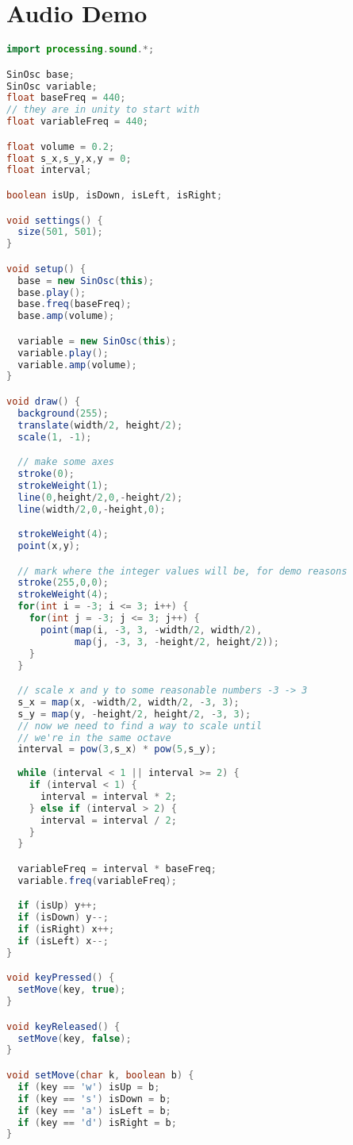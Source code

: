 \chapter{Audio Demo}
\label{audiodemo}
\begin{lstlisting}[language=java]
import processing.sound.*;

SinOsc base;
SinOsc variable;
float baseFreq = 440;
// they are in unity to start with
float variableFreq = 440;

float volume = 0.2;
float s_x,s_y,x,y = 0;
float interval;

boolean isUp, isDown, isLeft, isRight;

void settings() {
  size(501, 501);
}

void setup() {  
  base = new SinOsc(this);
  base.play();
  base.freq(baseFreq);
  base.amp(volume);

  variable = new SinOsc(this);
  variable.play();
  variable.amp(volume);
}

void draw() {
  background(255);
  translate(width/2, height/2);
  scale(1, -1);

  // make some axes
  stroke(0);
  strokeWeight(1);
  line(0,height/2,0,-height/2);
  line(width/2,0,-height,0);

  strokeWeight(4);
  point(x,y);

  // mark where the integer values will be, for demo reasons
  stroke(255,0,0);
  strokeWeight(4);
  for(int i = -3; i <= 3; i++) {
    for(int j = -3; j <= 3; j++) {
      point(map(i, -3, 3, -width/2, width/2),
            map(j, -3, 3, -height/2, height/2));
    }
  }

  // scale x and y to some reasonable numbers -3 -> 3 
  s_x = map(x, -width/2, width/2, -3, 3);
  s_y = map(y, -height/2, height/2, -3, 3);
  // now we need to find a way to scale until 
  // we're in the same octave
  interval = pow(3,s_x) * pow(5,s_y);
  
  while (interval < 1 || interval >= 2) {
    if (interval < 1) {
      interval = interval * 2;
    } else if (interval > 2) {
      interval = interval / 2;
    }
  }

  variableFreq = interval * baseFreq;
  variable.freq(variableFreq);

  if (isUp) y++;
  if (isDown) y--;
  if (isRight) x++;
  if (isLeft) x--;
}

void keyPressed() {
  setMove(key, true);
}

void keyReleased() {
  setMove(key, false);
}

void setMove(char k, boolean b) {
  if (key == 'w') isUp = b;
  if (key == 's') isDown = b;
  if (key == 'a') isLeft = b;
  if (key == 'd') isRight = b;
}
\end{lstlisting}

